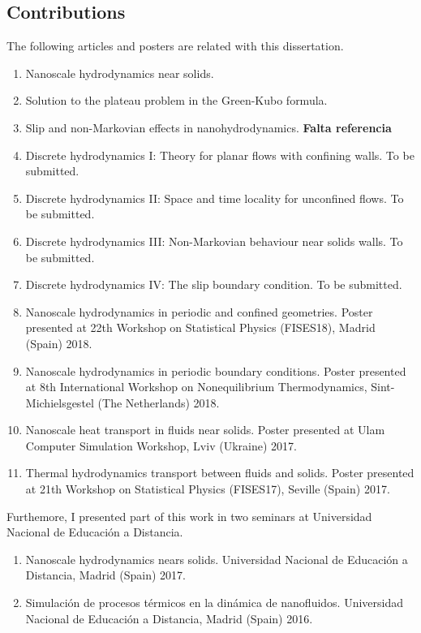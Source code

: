 \documentclass[b5paper,openright,10pt]{book}
\newcommand{\Note}[1]{{\bf \color{red}#1}}    %
\begin{document}
\pagestyle{Contents}




\begin{appendices}
\chapter{Contributions}\label{Ap:Contributions}
\pagestyle{noHeader}
The following articles and posters are related with this dissertation.
\begin{enumerate}
  \item \cite{Camargo2018} Nanoscale hydrodynamics near solids.
  \item \cite{Espanol2019e} Solution to the plateau problem in the Green-Kubo formula.
  \item \cite{} Slip and non-Markovian effects in nanohydrodynamics. \Note{Falta referencia}
  \item \cite{Discrete1} Discrete hydrodynamics I: Theory for planar flows with confining walls. To be submitted.
  \item \cite{Discrete2} Discrete hydrodynamics II: Space and time locality for unconfined flows. To be submitted. 
  \item \cite{Discrete3} Discrete hydrodynamics III: Non-Markovian behaviour near solids walls. To be submitted. 
  \item \cite{Discrete4} Discrete hydrodynamics IV: The slip boundary condition. To be submitted. 
  \item \cite{FISESMadrid} Nanoscale hydrodynamics in periodic and confined geometries. Poster presented at 22th Workshop on Statistical Physics (FISES18), Madrid (Spain) 2018.
  \item \cite{IWNET} Nanoscale hydrodynamics in periodic boundary conditions. Poster presented at 8th International Workshop on Nonequilibrium Thermodynamics, Sint-Michielsgestel (The Netherlands) 2018.
  \item \cite{Ulam} Nanoscale heat transport in fluids near solids. Poster presented at Ulam Computer Simulation Workshop, Lviv (Ukraine) 2017.
  \item \cite{FISESSevilla} Thermal hydrodynamics transport between fluids and solids. Poster presented at 21th Workshop on Statistical Physics (FISES17), Seville (Spain) 2017.
  \end{enumerate}

  Furthemore, I presented part of this work in two seminars at Universidad Nacional de Educación a Distancia. 
  \begin{enumerate}
  \item Nanoscale hydrodynamics nears solids. Universidad Nacional de Educación a Distancia, Madrid (Spain) 2017.
              \item Simulación de procesos térmicos en la dinámica de nanofluidos. Universidad Nacional de Educación a Distancia, Madrid (Spain) 2016.
  \end{enumerate}





\end{appendices}
\end{document}
